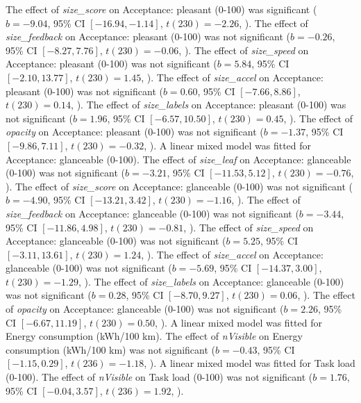 The effect of \textit{size\_score} on Acceptance: pleasant (0-100) was significant ($b = -9.04$, 95\% CI $[-16.94, -1.14]$, $t(230) = -2.26$, ).
The effect of \textit{size\_feedback} on Acceptance: pleasant (0-100) was not significant ($b = -0.26$, 95\% CI $[-8.27, 7.76]$, $t(230) = -0.06$, ).
The effect of \textit{size\_speed} on Acceptance: pleasant (0-100) was not significant ($b = 5.84$, 95\% CI $[-2.10, 13.77]$, $t(230) = 1.45$, ).
The effect of \textit{size\_accel} on Acceptance: pleasant (0-100) was not significant ($b = 0.60$, 95\% CI $[-7.66, 8.86]$, $t(230) = 0.14$, ).
The effect of \textit{size\_labels} on Acceptance: pleasant (0-100) was not significant ($b = 1.96$, 95\% CI $[-6.57, 10.50]$, $t(230) = 0.45$, ).
The effect of \textit{opacity} on Acceptance: pleasant (0-100) was not significant ($b = -1.37$, 95\% CI $[-9.86, 7.11]$, $t(230) = -0.32$, ).
A linear mixed model was fitted for Acceptance: glanceable (0-100).
The effect of \textit{size\_leaf} on Acceptance: glanceable (0-100) was not significant ($b = -3.21$, 95\% CI $[-11.53, 5.12]$, $t(230) = -0.76$, ).
The effect of \textit{size\_score} on Acceptance: glanceable (0-100) was not significant ($b = -4.90$, 95\% CI $[-13.21, 3.42]$, $t(230) = -1.16$, ).
The effect of \textit{size\_feedback} on Acceptance: glanceable (0-100) was not significant ($b = -3.44$, 95\% CI $[-11.86, 4.98]$, $t(230) = -0.81$, ).
The effect of \textit{size\_speed} on Acceptance: glanceable (0-100) was not significant ($b = 5.25$, 95\% CI $[-3.11, 13.61]$, $t(230) = 1.24$, ).
The effect of \textit{size\_accel} on Acceptance: glanceable (0-100) was not significant ($b = -5.69$, 95\% CI $[-14.37, 3.00]$, $t(230) = -1.29$, ).
The effect of \textit{size\_labels} on Acceptance: glanceable (0-100) was not significant ($b = 0.28$, 95\% CI $[-8.70, 9.27]$, $t(230) = 0.06$, ).
The effect of \textit{opacity} on Acceptance: glanceable (0-100) was not significant ($b = 2.26$, 95\% CI $[-6.67, 11.19]$, $t(230) = 0.50$, ).
A linear mixed model was fitted for Energy consumption (kWh/100 km).
The effect of \textit{nVisible} on Energy consumption (kWh/100 km) was not significant ($b = -0.43$, 95\% CI $[-1.15, 0.29]$, $t(236) = -1.18$, ).
A linear mixed model was fitted for Task load (0-100).
The effect of \textit{nVisible} on Task load (0-100) was not significant ($b = 1.76$, 95\% CI $[-0.04, 3.57]$, $t(236) = 1.92$, ).
